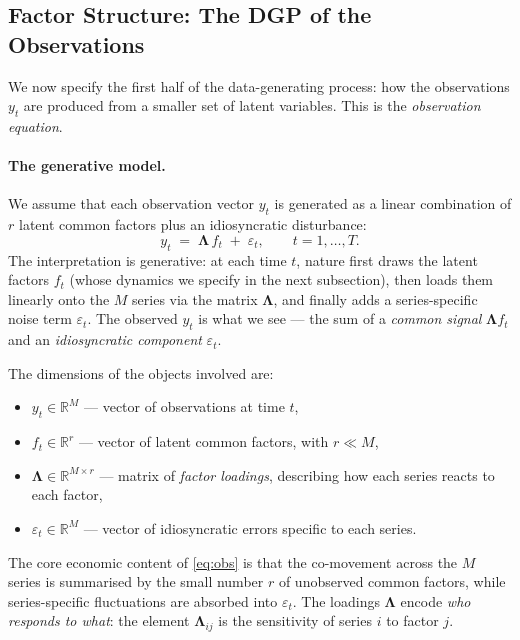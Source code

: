 \documentclass[11pt, a4paper, oneside]{article}
\newcommand{\mL}{\boldsymbol{\Lambda}}
\begin{document}
\newpage


\subsection{Factor Structure: The DGP of the Observations}

We now specify the first half of the data-generating process: how the
observations $y_t$ are produced from a smaller set of latent variables.
This is the \emph{observation equation}.

\paragraph{The generative model.}
We assume that each observation vector $y_t$ is generated as a linear
combination of $r$ latent common factors plus an idiosyncratic
disturbance:
\begin{equation}
y_t \;=\; \mL\, f_t \;+\; \varepsilon_t, \qquad t = 1, \ldots, T.
\label{eq:obs}
\end{equation}
The interpretation is generative: at each time $t$, nature first draws
the latent factors $f_t$ (whose dynamics we specify in the next
subsection), then loads them linearly onto the $M$ series via the matrix
$\mL$, and finally adds a series-specific noise term $\varepsilon_t$.
The observed $y_t$ is what we see — the sum of a \emph{common signal}
$\mL f_t$ and an \emph{idiosyncratic component} $\varepsilon_t$.

The dimensions of the objects involved are:
\begin{itemize}
    \item $y_t \in \mathbb{R}^{M}$ — vector of observations at time $t$,
    \item $f_t \in \mathbb{R}^{r}$ — vector of latent common factors,
          with $r \ll M$,
    \item $\mL \in \mathbb{R}^{M \times r}$ — matrix of \emph{factor
          loadings}, describing how each series reacts to each factor,
    \item $\varepsilon_t \in \mathbb{R}^{M}$ — vector of idiosyncratic
          errors specific to each series.
\end{itemize}
The core economic content of \eqref{eq:obs} is that the co-movement
across the $M$ series is summarised by the small number $r$ of unobserved
common factors, while series-specific fluctuations are absorbed into
$\varepsilon_t$. The loadings $\mL$ encode \emph{who responds to what}:
the element $\mL_{ij}$ is the sensitivity of series $i$ to factor $j$.
\end{document}

